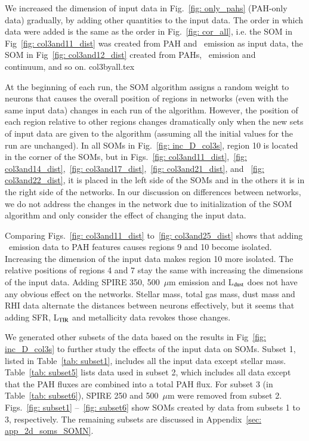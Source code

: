            We increased the dimension of input data in Fig.~\ref{fig: only_pahs} (PAH-only data) gradually, by adding other quantities to the input data. 
            The order in which data were added is the same as the order in Fig.~\ref{fig: cor_all}, i.e. the SOM in Fig~\ref{fig: col3and11_dist} was created from PAH and \halpha\ emission as input data, the SOM in Fig~\ref{fig: col3and12_dist} created from PAHs, \halpha~emission and \sii~ continuum, and so on. 
            {col3byall.tex}
            
            At the beginning of each run, the SOM algorithm assigns a random weight to neurons that causes the overall position of regions in networks (even with the same input data) changes in each run of the algorithm.
            However, the position of each region relative to other regions changes dramatically only when the new sets of input data are given to the algorithm (assuming all the initial values for the run are unchanged).
            In all SOMs in Fig.~\ref{fig: inc_D_col3s}, region 10 is located in the corner of the SOMs, but in  Figs.~\ref{fig: col3and11_dist},~\ref{fig: col3and14_dist},~\ref{fig: col3and17_dist},~\ref{fig: col3and21_dist}, and ~\ref{fig: col3and22_dist}, it is placed in the left side of the SOMs and in the others it is in the right side of the networks.
            In our discussion on differences between networks, we do not address the changes in the network due to initialization of the SOM algorithm and only consider the effect of changing the input data.
            
            Comparing Figs.~\ref{fig: col3and11_dist} to~\ref{fig: col3and25_dist} shows that adding \halpha~emission data to PAH features causes regions 9 and 10 become isolated. 
            Increasing the dimension of the input data makes region 10 more isolated.
            The relative positions of regions 4 and 7 stay the same with increasing the dimensions of the input data. 
            Adding SPIRE 350, 500~$\mu$m emission and L$_{\rm dust}$ does not have any obvious effect on the networks.
            Stellar mass, total gas mass, dust mass and RHI data alternate the distances between neurons effectively, but it seems that adding SFR, L$_{\rm TIR}$ and metallicity data revokes those changes.
            
            We generated other subsets of the data based on the results in Fig~\ref{fig: inc_D_col3s} to further study the effects of the input data on SOMs.
            Subset 1, listed in Table~\ref{tab: subset1}, includes all the input data except stellar mass.
            Table~\ref{tab: subset5} lists data used in subset 2, which includes all data except that the PAH fluxes are combined into a total PAH flux. 
            For subset 3 (in Table~\ref{tab: subset6}), SPIRE 250 and 500~$\mu$m were removed from subset 2.
            Figs.~\ref{fig: subset1} --~\ref{fig: subset6} show SOMs created by data from subsets 1 to 3, respectively.
            The remaining subsets are discussed in Appendix~\ref{sec: app_2d_soms_SOMN}.

